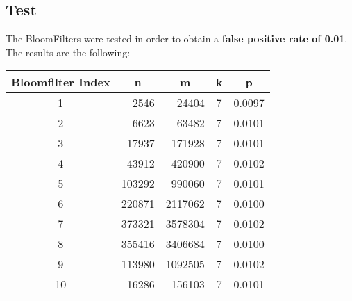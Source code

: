 \subsection*{Test}\label{sub:testHadoop}
The BloomFilters were tested in order to obtain a \textbf{false positive rate of 0.01}. The results are the following:\\

\renewcommand{\arraystretch}{1.5}
\begin{center}
	\begin{tabular}{|c | r | r | c | c |} 
		\hline
		\textbf{Bloomfilter Index} & \multicolumn{1}{c|}{\textbf{n}} & \multicolumn{1}{c|}{\textbf{m}} & \textbf{k} & \textbf{p} \\ 
		\hline
		1 & 2546 & 24404 & 7 & 0.0097\\ 
		\hline
		2 & 6623 & 63482 & 7 & 0.0101\\
		\hline
		3 & 17937 & 171928 & 7 & 0.0101 \\
		\hline
		4 & 43912 & 420900 & 7 & 0.0102\\
		\hline
		5 & 103292 & 990060 & 7 & 0.0101\\
		\hline
		6 & 220871 & 2117062 & 7 & 0.0100 \\ 
		\hline
		7 & 373321 & 3578304 & 7 & 0.0102\\ 
		\hline
		8 & 355416 & 3406684 & 7 & 0.0100\\ 
		\hline
		9 & 113980 & 1092505 & 7 & 0.0102\\ 
		\hline
		10 & 16286 & 156103 & 7 & 0.0101\\ 
		\hline
	\end{tabular}
\end{center}

